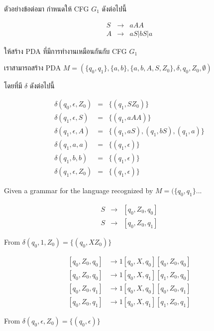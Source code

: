 \par{
ตัวอย่างข้อต่อมา กำหนดให้ CFG $G_1$ ดังต่อไปนี้ 

\begin{eqnarray*}
S & \rightarrow & aAA \\
A & \rightarrow & aS|bS|a 
\end{eqnarray*}

ให้สร้าง PDA ที่มีการทำงานเหมือนกันกับ CFG $G_1$
}

\par{
เราสามารถสร้าง PDA $M = (\{q_0, q_1\},\{a, b\}, \{a, b, A, S, Z_0\}, \delta, q_0,  Z_0, \emptyset)$

โดยที่มี $\delta$ ดังต่อไปนี้ 

\begin{eqnarray*}
\delta(q_0, \epsilon, Z_0) & = & \{(q_1, SZ_0)\} \\
\delta(q_1, \epsilon, S) & = & \{(q_1, aAA)\} \\
\delta(q_1, \epsilon, A) & = & \{(q_1, aS), (q_1, bS), (q_1, a)\} \\
\delta(q_1, a, a) & = & \{(q_1, \epsilon)\} \\ 
\delta(q_1, b, b) & = & \{(q_1, \epsilon)\} \\
\delta(q_1, \epsilon, Z_0) & = & \{(q_1, \epsilon)\}
\end{eqnarray*}
}



\par{
Given a grammar for the language recognized by $M=(\{q_0, q_1\} ...$
}

\begin{eqnarray*}
S & \rightarrow & [q_0, Z_0, q_0] \\
S & \rightarrow & [q_0, Z_0, q_1] 
\end{eqnarray*}

From $\delta(q_0, 1, Z_0) = \{(q_0, XZ_0)\}$

\begin{eqnarray*}
\left[q_0, Z_0, q_0\right] & \rightarrow 1[q_0, X, q_0][q_0, Z_0, q_0] \\
\left[q_0, Z_0, q_0\right] & \rightarrow 1[q_0, X, q_1][q_1, Z_0, q_0] \\
\left[q_0, Z_0, q_1\right] & \rightarrow 1[q_0, X, q_0][q_0, Z_0, q_1] \\
\left[q_0, Z_0, q_1\right] & \rightarrow 1[q_0, X, q_1][q_1, Z_0, q_1] 
\end{eqnarray*}

From $\delta(q_0, \epsilon, Z_0) = \{(q_0, \epsilon)\}$

